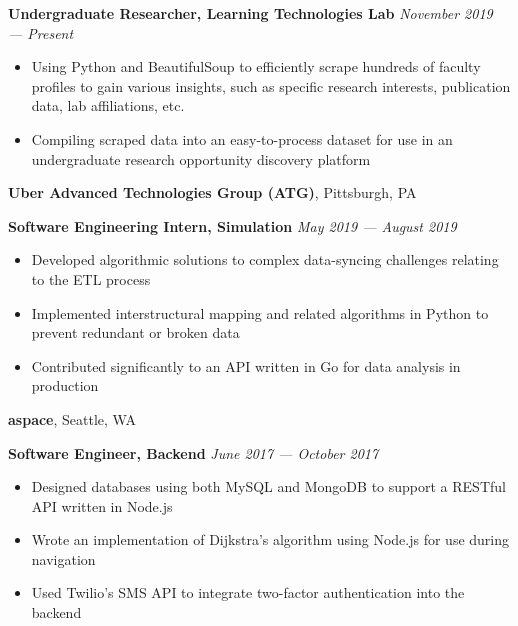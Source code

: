 \documentclass[11pt]{article}
\begin{document}
\begin{flushleft}
		\begin{rightbracket}
			{\small \textbf{Undergraduate Researcher, Learning Technologies Lab}} \hfill \textit{\small November 2019 --- Present}
			\begin{itemize}
				\item Using Python and BeautifulSoup to efficiently scrape hundreds of faculty profiles to gain various insights, such as specific research interests, publication data, lab affiliations, etc.
				\vspace{-2mm}
				\item Compiling scraped data into an easy-to-process dataset for use in an undergraduate research opportunity discovery platform
			\end{itemize}
		\end{rightbracket}


		\vspace{-1.35mm}
		\textbf{Uber Advanced Technologies Group (ATG)}, Pittsburgh, PA\\
		\begin{rightbracket}
			{\small \textbf{Software Engineering Intern, Simulation}} \hfill \textit{\small May 2019 --- August 2019}
			\begin{itemize}
				\item Developed algorithmic solutions to complex data-syncing challenges relating to the ETL process
				\vspace{-2mm}
				\item Implemented interstructural mapping and related algorithms in Python to prevent redundant or broken data
				\vspace{-2mm}
				\item Contributed significantly to an API written in Go for data analysis in production
			\end{itemize}
		\end{rightbracket}

	
		\vspace{-1.35mm}
		\textbf{aspace}, Seattle, WA\\
		\begin{rightbracket}
			{\small \textbf{Software Engineer, Backend} \hfill \textit{June 2017 --- October 2017}}

			\begin{itemize}
				\item Designed databases using both MySQL and MongoDB to support a RESTful API written in Node.js
				\vspace{-2mm}
				\item Wrote an implementation of Dijkstra's algorithm using Node.js for use during navigation
				\vspace{-2mm}
				\item Used Twilio's SMS API to integrate two-factor authentication into the backend
			\end{itemize}
		\end{rightbracket}


\end{flushleft}
\end{document}

